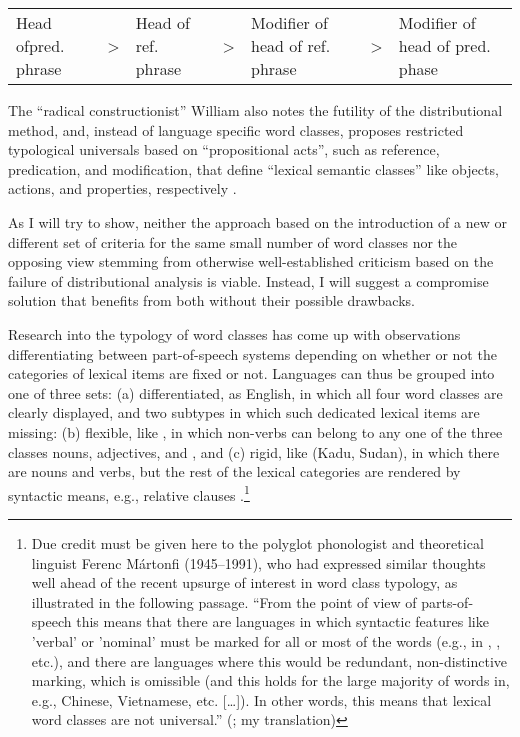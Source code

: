 \documentclass[output=paper]{langsci/langscibook}
\begin{document}
\ea\label{ex:27.1}%
    \begin{tabularx}{\linewidth}[t]{QcQcQcQ}
        Head of\newline pred. phrase & > & Head of ref. phrase & > &
        Modifier of head of ref. phrase & > & Modifier of head of pred. phase\\
    \end{tabularx}
\z

The \enquote{radical constructionist} William \citet{Croft2005} also notes the
futility of the distributional method, and, instead of language specific word
classes, proposes restricted typological universals based on “propositional
acts”, such as reference, predication, and modification, that define “lexical
semantic classes” like objects, actions, and properties, respectively
\parencite[438]{Croft2005}.

As I will try to show, neither the approach based on the introduction of a new
or different set of criteria for the same small number of word classes nor the
opposing view stemming from otherwise well-established criticism based on the
failure of distributional analysis is viable. Instead, I will suggest a
compromise solution that benefits from both without their possible
drawbacks.\largerpage[2]

Research into the typology of word classes has come up with observations
differentiating between part-of-speech systems depending on whether or not the
categories of lexical items are fixed or not. Languages can thus be grouped
into one of three sets: (a) differentiated, as English, in which all four word
classes are clearly displayed, and two subtypes in which such dedicated lexical
items are missing: (b) flexible, like , in which non-verbs can
belong to any one of the three classes nouns, adjectives, and , and (c)
rigid, like  (Kadu, Sudan), in which there are nouns and verbs, but the
rest of the lexical categories are rendered by syntactic means, e.g., relative
clauses \parencite[32ff.]{Hengeveld2013}.\footnote{Due credit must be given here
    to the polyglot phonologist and theoretical linguist Ferenc Mártonfi
    (1945--1991), who had expressed similar thoughts well ahead of the recent
    upsurge of interest in word class typology, as illustrated in the following
    passage.  \enquote{From the point of view of parts-of-speech this means
        that there are languages in which syntactic features like ’verbal’ or
        ’nominal’ must be marked for all or most of the words (e.g., in
        , , etc.), and there are languages where this would be
        redundant, non-distinctive marking, which is omissible (and this holds
        for the large majority of words in, e.g., Chinese, Vietnamese, etc.
[\dots]).  In other words, this means that lexical word classes are not
universal.} (\citealt[201]{Martonfi1973}; my translation)}
\end{document}
